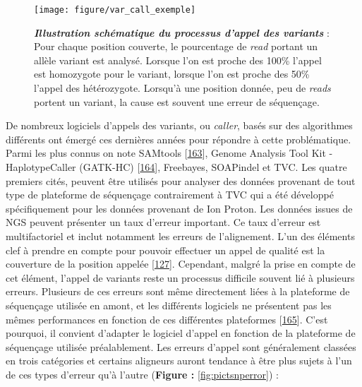 \documentclass[12pt,a4paper,twoside]{ugathesis}
\theoremstyle{definition}
\theoremstyle{definition}
\theoremstyle{definition}
\theoremstyle{remark}
\begin{document}
\begin{figure}

{\centering \texttt{[image: figure/var\_call\_exemple]} 

}

\caption[Illustration schématique du processus d'appel des variants]{\textbf{\emph{Illustration schématique du
processus d'appel des variants}} : Pour chaque position couverte, le
pourcentage de \emph{read} portant un allèle variant est analysé.
Lorsque l'on est proche des 100\% l'appel est homozygote pour le
variant, lorsque l'on est proche des 50\% l'appel des hétérozygote.
Lorsqu'à une position donnée, peu de \emph{reads} portent un variant, la
cause est souvent une erreur de séquençage.}\label{fig:picvarcallprocess}
\end{figure}









De nombreux logiciels d'appels des variants, ou \emph{caller}, basés sur
des algorithmes différents ont émergé ces dernières années pour répondre
à cette problématique. Parmi les plus connus on note SAMtools
{[}\protect\hyperlink{ref-Li2009}{163}{]}, Genome Analysis Tool Kit -
HaplotypeCaller (GATK-HC)
{[}\protect\hyperlink{ref-McKenna2010}{164}{]}, Freebayes, SOAPindel et
TVC. Les quatre premiers cités, peuvent être utilisés pour analyser des
données provenant de tout type de plateforme de séquençage contrairement
à TVC qui a été développé spécifiquement pour les données provenant de
Ion Proton. Les données issues de NGS peuvent présenter un taux d'erreur
important. Ce taux d'erreur est multifactoriel et inclut notamment les
erreurs de l'alignement. L'un des éléments clef à prendre en compte pour
pouvoir effectuer un appel de qualité est la couverture de la position
appelée {[}\protect\hyperlink{ref-Sims2014}{127}{]}. Cependant, malgré
la prise en compte de cet élément, l'appel de variants reste un
processus difficile souvent lié à plusieurs erreurs. Plusieurs de ces
erreurs sont même directement liées à la plateforme de séquençage
utilisée en amont, et les différents logiciels ne présentent pas les
mêmes performances en fonction de ces différentes plateformes
{[}\protect\hyperlink{ref-Hwang2015}{165}{]}. C'est pourquoi, il
convient d'adapter le logiciel d'appel en fonction de la plateforme de
séquençage utilisée préalablement. Les erreurs d'appel sont généralement
classées en trois catégories et certains aligneurs auront tendance à
être plus sujets à l'un de ces types d'erreur qu'à l'autre
(\textbf{Figure : }\ref{fig:pictsnperror}) :
\end{document}
